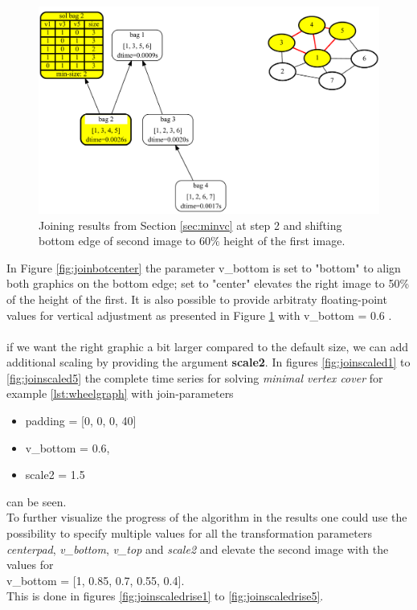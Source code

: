 \documentclass[a4paper, 12pt, bibliography=totoc]{scrartcl}
\begin{document}
\begin{figure}[H]
	\centering
	\includegraphics[width=0.9\linewidth,height=0.9\textheight,keepaspectratio]{images/SVGJOIN/default_062.pdf}
	\caption{Joining results from Section \ref{sec:minvc} at step 2 and shifting bottom edge of second image to $60\%$ height of the first image.}
	\label{fig:join60}
\end{figure}

In Figure \ref{fig:joinbotcenter} the parameter v\_bottom is set to "bottom" to align both graphics on the bottom edge; set to "center" elevates the right image to 50\% of the height of the first. It is also possible to provide arbitraty floating-point values for vertical adjustment as presented in Figure \ref{fig:join60} with v\_bottom = 0.6 .\\
\\
if we want the right graphic a bit larger compared to the default size, we can add additional scaling by providing the argument \textbf{scale2}. In figures \ref{fig:joinscaled1} to \ref{fig:joinscaled5} the complete time series for solving \textit{minimal vertex cover} for example \ref{lst:wheelgraph} with join-parameters
\begin{itemize}
	\item[] padding = [0, 0, 0, 40]
	\item[] v\_bottom = 0.6,
	\item[] scale2 = 1.5
\end{itemize}
can be seen. \\
To further visualize the progress of the algorithm in the results one could use the possibility to specify multiple values for all the transformation parameters \textit{centerpad}, \textit{v\_bottom}, \textit{v\_top} and \textit{scale2} and elevate the second image with the values for\\
 v\_bottom = [1, 0.85, 0.7, 0.55, 0.4]. \\
 This is done in figures \ref{fig:joinscaledrise1} to \ref{fig:joinscaledrise5}.
\end{document}
